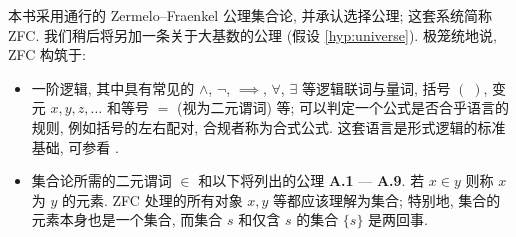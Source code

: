 本书采用通行的 Zermelo--Fraenkel 公理集合论, 并承认选择公理; 这套系统简称 ZFC. 我们稍后将另加一条关于大基数的公理 (假设 \ref{hyp:universe}). 极笼统地说, ZFC 构筑于:
\begin{itemize}
	\item 一阶逻辑, 其中具有常见的 $\wedge$, $\neg$, $\implies$, $\forall$, $\exists$ 等逻辑联词与量词, 括号 $(\;)$, 变元 $x, y, z, \ldots$ 和等号 $=$ (视为二元谓词) 等; 可以判定一个公式是否合乎语言的规则, 例如括号的左右配对, 合规者称为合式公式. 这套语言是形式逻辑的标准基础, 可参看 \cite[第 2 章]{Feng17}.
	\item 集合论所需的二元谓词 $\in$ 和以下将列出的公理 \textbf{A.1} --- \textbf{A.9}. 若 $x \in y$ 则称 $x$ 为 $y$ 的元素. ZFC 处理的所有对象 $x,y$ 等都应该理解为集合; 特别地, 集合的元素本身也是一个集合, 而集合 $s$ 和仅含 $s$ 的集合 $\{s\}$ 是两回事.
\end{itemize}


